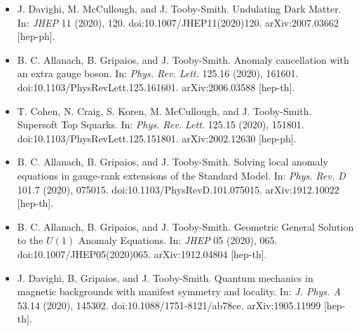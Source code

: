 \documentclass[14pt,letter]{article}
\newcommand{\includePublications}{T} %
\newcommand{\mybullet}{\textcolor{mycolor}{$\ast$}\ }
\newcounter{customtitle}
\begin{document}
\begin{itemize}[label=\mybullet]
\item J. Davighi, M. McCullough, and J. Tooby-Smith. {\color{mycolor} Undulating Dark Matter}. In: \emph{JHEP} 11 (2020), 120. doi:10.1007/JHEP11(2020)120. arXiv:2007.03662 [hep-ph].

\item B. C. Allanach, B. Gripaios, and J. Tooby-Smith. {\color{mycolor} Anomaly cancellation with an extra gauge boson}. In: \emph{Phys. Rev. Lett.} 125.16 (2020), 161601. doi:10.1103/PhysRevLett.125.161601. arXiv:2006.03588 [hep-th].

\item T. Cohen, N. Craig, S. Koren, M. McCullough, and J. Tooby-Smith. {\color{mycolor} Supersoft Top Squarks}. In: \emph{Phys. Rev. Lett.} 125.15 (2020), 151801. doi:10.1103/PhysRevLett.125.151801. arXiv:2002.12630 [hep-ph].

\item B. C. Allanach, B. Gripaios, and J. Tooby-Smith. {\color{mycolor} Solving local anomaly equations in gauge-rank extensions of the Standard Model}. In: \emph{Phys. Rev. D} 101.7 (2020), 075015. doi:10.1103/PhysRevD.101.075015. arXiv:1912.10022 [hep-th].

\item B. C. Allanach, B. Gripaios, and J. Tooby-Smith. {\color{mycolor} Geometric General Solution to the $U(1)$ Anomaly Equations}. In: \emph{JHEP} 05 (2020), 065. doi:10.1007/JHEP05(2020)065. arXiv:1912.04804 [hep-th].

\item J. Davighi, B. Gripaios, and J. Tooby-Smith. {\color{mycolor} Quantum mechanics in magnetic backgrounds with manifest symmetry and locality}. In: \emph{J. Phys. A} 53.14 (2020), 145302. doi:10.1088/1751-8121/ab78ce. arXiv:1905.11999 [hep-th].
\end{itemize}




%


%
\end{document}
